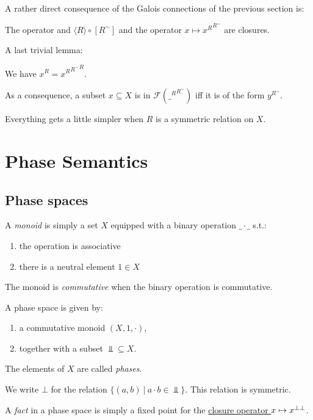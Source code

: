 A rather direct consequence of the Galois connections of the previous
section is:

\begin{lemma}
The operator and $\langle R\rangle \circ [R^\sim]$ and the operator $x\mapsto {x^R}^{R^\sim}$ are closures.
\end{lemma}

A last trivial lemma:

\begin{lemma}
We have $x^R = {{x^R}^{R^\sim}}^{R}$.

As a consequence, a subset $x\subseteq X$ is in $\mathcal{F}({\_^R}^{R^\sim})$ iff it is of the form $y^{R^\sim}$.
\end{lemma}

\begin{remark}
Everything gets a little simpler when $R$ is a symmetric relation on $X$.
\end{remark}

\section{Phase Semantics}\label{phase-semantics-1}

\subsection{Phase spaces}\label{phase-spaces}

\begin{definition}[monoid]
A \emph{monoid} is simply a set $X$ equipped with a binary operation $\_\cdot\_$ s.t.:
\begin{enumerate}
\item the operation is associative
\item there is a neutral element $1\in X$
\end{enumerate}
The monoid is \emph{commutative} when the binary operation is commutative.
\end{definition}

\begin{definition}
A phase space is given by:
\begin{enumerate}
\item a commutative monoid $(X,1,\cdot)$,
\item together with a subset $\Bot\subseteq X$.
\end{enumerate}
The elements of $X$ are called \emph{phases}.

We write $\bot$ for the relation $\{(a,b)\ |\ a\cdot b \in \Bot\}$. This relation is symmetric.

A \emph{fact} in a phase space is simply a fixed point for the \hyperref[orthogonality-relation]{closure operator $x\mapsto x^{\bot\bot}$}.
\end{definition}

